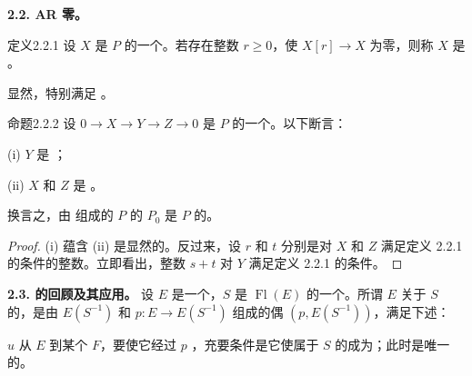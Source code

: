 \textbf{2.2. AR 零。}
\begin{SGAresult}{定义}{2.2.1}
设 $X$ 是 $P$ 的一个。若存在整数 $r\geq0$，使 $X[r]\to X$ 为零，则称 $X$ 是 。
\end{SGAresult}
显然，特别满足 。
\begin{SGAresult}{命题}{2.2.2}
设 $0\to X\to Y\to Z\to0$ 是 $P$ 的一个。以下断言：

(i) $Y$ 是 ；

(ii) $X$ 和 $Z$ 是 。

换言之，由 组成的 $P$ 的 $P_0$ 是 $P$ 的。
\end{SGAresult}
\begin{proof}(i) 蕴含 (ii) 是显然的。反过来，设 $r$ 和 $t$ 分别是对 $X$ 和 $Z$ 满足定义 2.2.1 的条件的整数。立即看出，整数 $s+t$ 对 $Y$ 满足定义 2.2.1 的条件。\end{proof}
\textbf{2.3. 的回顾及其应用。} 设 $E$ 是一个，$S$ 是 $\operatorname{Fl}(E)$ 的一个。所谓 $E$ 关于 $S$ 的，是由 $E(S^{-1})$ 和 $p:E\to E(S^{-1})$ 组成的偶 $(p,E(S^{-1}))$，满足下述：

 $u$ 从 $E$ 到某个 $F$，要使它经过 $p$ ，充要条件是它使属于 $S$ 的成为；此时是唯一的。

